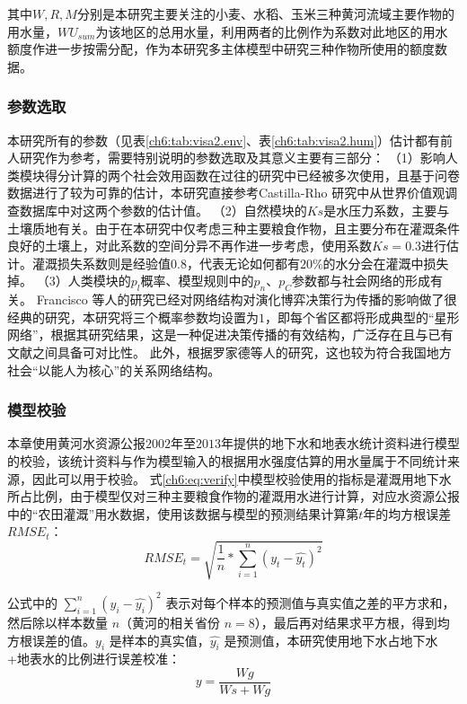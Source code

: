 其中$W, R, M$分别是本研究主要关注的小麦、水稻、玉米三种黄河流域主要作物的用水量，$WU_{sum}$为该地区的总用水量，利用两者的比例作为系数对此地区的用水额度作进一步按需分配，作为本研究多主体模型中研究三种作物所使用的额度数据。



\subsubsection{参数选取}

本研究所有的参数（见表\ref{ch6:tab:visa2.env}、表\ref{ch6:tab:visa2.hum}）估计都有前人研究作为参考，需要特别说明的参数选取及其意义主要有三部分：
（1）影响人类模块得分计算的两个社会效用函数在过往的研究中已经被多次使用，且基于问卷数据进行了较为可靠的估计，本研究直接参考Castilla-Rho 研究中从世界价值观调查数据库中对这两个参数的估计值\cite{castillarho2015, castillarho2017, castillarho2020}。
（2）自然模块的$Ks$是水压力系数，主要与土壤质地有关。由于在本研究中仅考虑三种主要粮食作物，且主要分布在灌溉条件良好的土壤上，对此系数的空间分异不再作进一步考虑，使用系数$Ks = 0.3$进行估计。灌溉损失系数则是经验值$0.8$，代表无论如何都有$20\%$的水分会在灌溉中损失掉。
（3）人类模块的$p_l$概率、模型规则中的$p_n$、$p_C$参数都与社会网络的形成有关。
Francisco 等人的研究已经对网络结构对演化博弈决策行为传播的影响做了很经典的研究\cite{santos2008}，本研究将三个概率参数均设置为$1$，即每个省区都将形成典型的“星形网络”，根据其研究结果，这是一种促进决策传播的有效结构，广泛存在且与已有文献之间具备可对比性\cite{santos2008}。
此外，根据罗家德等人的研究，这也较为符合我国地方社会“以能人为核心”的关系网络结构\cite{luojiade2013}。

\subsubsection{模型校验}

本章使用黄河水资源公报$2002$年至$2013$年提供的地下水和地表水统计资料进行模型的校验，该统计资料与作为模型输入的根据用水强度估算的用水量属于不同统计来源，因此可以用于校验。
式\ref{ch6:eq:verify}中模型校验使用的指标是灌溉用地下水所占比例，由于模型仅对三种主要粮食作物的灌溉用水进行计算，对应水资源公报中的“农田灌溉”用水数据，使用该数据与模型的预测结果计算第$t$年的均方根误差$RMSE_t$：
\begin{equation}
    \label{ch6:eq:rmse}
    RMSE_t = \sqrt{\frac{1}{n}*\sum_{i=1}^{n}{(y_t - \hat{y_t})}^2}
\end{equation}

公式中的 $\sum_{i=1}^{n}{(y_i - \hat{y_i})}^2$ 表示对每个样本的预测值与真实值之差的平方求和，然后除以样本数量 $n$（黄河的相关省份 $n = 8$），最后再对结果求平方根，得到均方根误差的值。$y_i$ 是样本的真实值，$\hat{y_i}$ 是预测值，本研究使用地下水占地下水+地表水的比例进行误差校准：
\begin{equation}
    \label{ch6:eq:verify}
    y = \frac{Wg}{Ws + Wg}
\end{equation}

